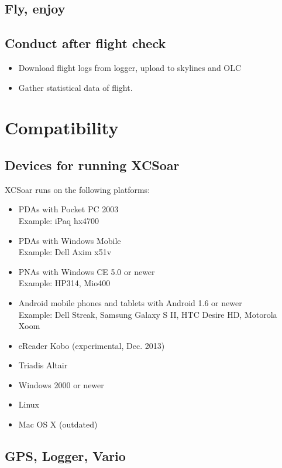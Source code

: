 \subsection*{Fly, enjoy}
\vspace{4em}

\subsection*{Conduct after flight check}
\begin{itemize}
\item Download flight logs from logger, upload to skylines and OLC
\item Gather statistical data of flight.
\end{itemize}
\newpage




\section{Compatibility}

\subsection*{Devices for running XCSoar}

XCSoar runs on the following platforms:

\begin{itemize}
\item PDAs with Pocket PC 2003 \\
  Example: iPaq hx4700
\item PDAs with Windows Mobile \\
  Example: Dell Axim x51v
\item PNAs with Windows CE 5.0 or newer \\
  Example: HP314, Mio400
  \item Android mobile phones and tablets with Android 1.6 or newer \\
  Example: Dell Streak, Samsung Galaxy S II, HTC Desire HD,
  Motorola Xoom
\item eReader Kobo (experimental, Dec. 2013)
\item Triadis Altair
\item Windows 2000 or newer
\item Linux
\item Mac OS X (outdated)
\end{itemize}

\subsection*{GPS, Logger, Vario}

